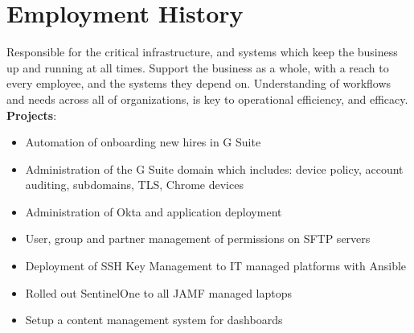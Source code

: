 \documentclass[letter,sans]{moderncv}
\begin{document}
\maketitle

\vspace{-0.6in}

\section{Employment History}

{Responsible for the critical infrastructure, and systems which keep the business up and running at all times. Support the business as a whole, with a reach to every employee, and the systems they depend on. Understanding of workflows and needs across all of organizations, is key to operational efficiency, and efficacy.\\
  \textbf{Projects}:
  \begin{itemize}
  \item Automation of onboarding new hires in G Suite
  \item Administration of the G Suite domain which includes: device policy, account auditing, subdomains, TLS, Chrome devices
  \item Administration of Okta and application deployment
  \item User, group and partner management of permissions on SFTP servers
  \item Deployment of SSH Key Management to IT managed platforms with Ansible
  \item Rolled out SentinelOne to all JAMF managed laptops
  \item Setup a content management system for dashboards
  \end{itemize}
}
\end{document}
